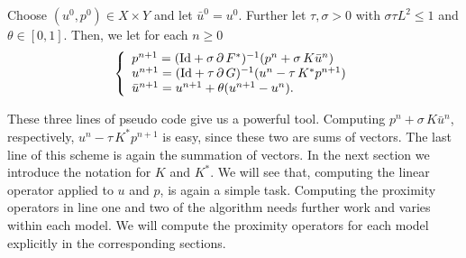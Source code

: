     \begin{algorithm}
    \label{alg:fast_primal_dual_algorithm}
        Choose $(u^{0}, p^{0}) \in X \times Y$ and let $\bar{u}^{0} = u^{0}$. Further let $\tau, \sigma > 0$ with $\sigma\tau L^{2} \le 1$ and $\theta \in [0, 1]$. Then, we let for each $n \ge 0$
            \begin{equation}
                \left\{ 
                    \begin{array}{l l}
                        p^{n+1} = (\textnormal{Id} + \sigma\,\partial\,F^{\ast})^{-1}(p^{n} + \sigma\,K\bar{u}^{n}) \\
                        u^{n+1} = (\textnormal{Id} + \tau\,\partial\,G)^{-1}(u^{n} - \tau\,K^{\ast}p^{n+1}) \\
                        \bar{u}^{n+1} = u^{n+1} + \theta (u^{n+1} - u^{n}).
                    \end{array}
                \right.
            \label{eq:fast_primal_dual_algorithm}
            \end{equation}
    \end{algorithm}

    These three lines of pseudo code give us a powerful tool. Computing $p^{n} + \sigma\,K\bar{u}^{n}$, respectively, $u^{n} - \tau\,K^{\ast}p^{n+1}$ is easy, since these two are sums of vectors. The last line of this scheme is again the summation of vectors. In the next section we introduce the notation for $K$ and $K^{\ast}$. We will see that, computing the linear operator applied to $u$ and $p$, is again a simple task. Computing the proximity operators in line one and two of the algorithm needs further work and varies within each model. We will compute the proximity operators for each model explicitly in the corresponding sections.

